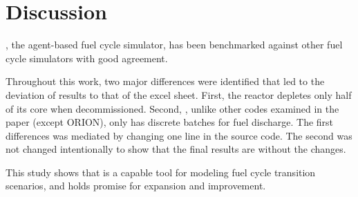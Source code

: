 \section{Discussion}

\Cyclus, the agent-based fuel cycle simulator,
has been benchmarked against other fuel cycle
simulators with good agreement.

Throughout this work, two major differences were identified
that led to the deviation
of \Cyclus results to that of the excel sheet. First,
the \Cycamore reactor depletes only half of its core
when decommissioned. Second, \Cyclus, unlike other
codes examined in the paper (except ORION), only has
discrete batches for fuel discharge.
The first differences was mediated by changing one line in
the source code. The second was not changed intentionally
to show that the final results are without the changes.

This study shows that \Cyclus is a capable tool for modeling
fuel cycle transition scenarios, and holds promise for
expansion and improvement.